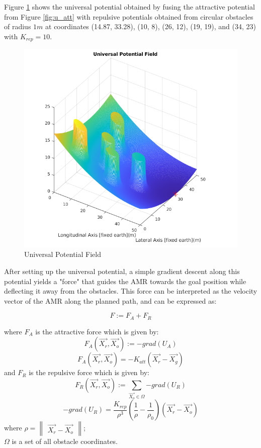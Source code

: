 \documentclass[a4paper, twocolumn]{article}
\begin{document}
Figure \ref{fig:u_uni_plot} shows the universal potential obtained by fusing the attractive potential from Figure \ref{fig:u_att} with repulsive 
potentials obtained from circular obstacles of radius $1m$ at coordinates (14.87, 33.28), (10, 8), (26, 12), (19, 19), and (34, 23) 
with $K_{rep}= 10$.


\begin{figure}
    \centering
    \includegraphics[scale=0.45]{presentation/img/u_uni_plot.png}
    \caption{Universal Potential Field}
    \label{fig:u_uni_plot}
\end{figure}


After setting up the universal potential, a simple gradient descent along this potential yields a "force" that guides the AMR towards the goal position 
while deflecting it away from the obstacles. This force can be interpreted as the velocity vector of the AMR along the planned path, 
and can be expressed as: 

$$F:= F_{A} + F_{R}$$

\noindent
where $F_{A}$ is the attractive force which is given by:
$$F_{A}(\vec{X_{r}}, \vec{X_{o}}):= -grad(U_{A})$$
$$F_{A}(\vec{X_{r}}, \vec{X_{o}})= -K_{att} \left(\vec{X_{r}} - \vec{X_{g}}\right)$$
\noindent
and $F_{R}$ is the repulsive force which is given by:
$$F_{R}(\vec{X_{r}}, \vec{X_{o}}):= \sum_{ \vec{X_{o}} \in \Omega}{-grad(U_{R})} $$
$$-grad(U_{R})= \frac{K_{rep}}{\rho^{3}} 
        \left( \frac{1}{\rho} - \frac{1}{\rho_{0}} \right) 
        \left(\vec{X_{r}} - \vec{X_{o}}\right) $$
\noindent
where 
$\rho= \begin{Vmatrix}\vec{X_{r}} - \vec{X_{o}}\end{Vmatrix}$; \\
$\Omega$ is a set of all obstacle coordinates.
 
\end{document}
